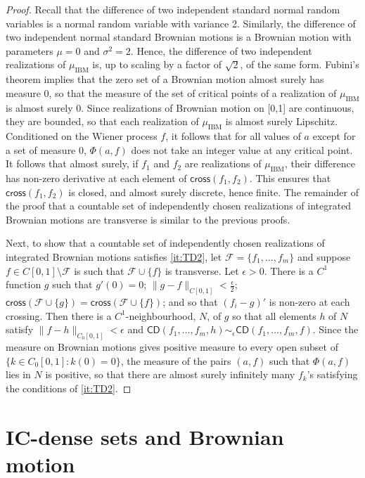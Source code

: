 \documentclass{daj}
\newcommand{\cross}{\mathsf{cross}}
\newcommand{\CD}{\mathsf{CD}}
\begin{document}
\begin{proof}
Recall that the difference of two independent standard normal random variables is a normal random
variable with variance 2. Similarly, the difference of two independent normal standard Brownian motions
is a Brownian motion with parameters $\mu=0$ and $\sigma^2=2$. Hence, the difference of two
independent realizations of $\mu_\text{IBM}$ is, up to scaling by a factor of $\sqrt 2$, of the same form.
Fubini's theorem implies that the zero set of a Brownian motion almost surely has measure 0, so that
the measure of the set of critical points of a realization of $\mu_\text{IBM}$ is almost surely 0.
Since realizations of Brownian motion on [0,1] are continuous, they are bounded, so that each realization of
$\mu_\text{IBM}$ is almost surely Lipschitz. Conditioned on the Wiener process $f$, it follows that for
all values of $a$ except for a set of measure 0, $\Phi(a,f)$ does not take an integer value at any
critical point. It follows that almost surely, if $f_1$ and $f_2$ are realizations of $\mu_\text{IBM}$,
their difference has non-zero derivative at each element of $\cross(f_1,f_2)$. This ensures
that $\cross(f_1,f_2)$ is closed, and almost surely discrete, hence finite. The remainder of the proof
that a countable set of independently chosen realizations of integrated Brownian motions are
transverse is similar to the previous proofs.

Next, to show that a countable set of independently chosen realizations of integrated Brownian
motions satisfies \ref{it:TD2}, let $\mathcal F=\{f_1,\ldots,f_m\}$ and suppose
$f\in C[0,1]\setminus\mathcal F$ is such that $\mathcal F\cup\{f\}$ is transverse.
Let $\epsilon>0$. There is a $C^1$ function $g$ such that $g'(0)=0$;
$\|g-f\|_{C[0,1]}<\frac\epsilon2$; $\cross(\mathcal F\cup\{g\})=
\cross(\mathcal F\cup\{f\})$; and so that $(f_i-g)'$ is non-zero at each crossing. Then
there is a $C^1$-neighbourhood, $N$, of $g$ so that all elements $h$ of $N$
satisfy $\|f-h\|_{C_0[0,1]}<\epsilon$ and $\CD(f_1,\ldots,f_m,h)\sim_\epsilon
\CD(f_1,\ldots,f_m,f)$. Since the measure on Brownian motions gives positive measure
to every open subset of $\{k\in C_0[0,1]\colon k(0)=0\}$,
the measure of the pairs $(a,f)$ such that $\Phi(a,f)$ lies in $N$
is positive, so that there are almost surely infinitely many $f_k$'s satisfying the conditions
of \ref{it:TD2}.
\end{proof}

\section{IC-dense sets and Brownian motion}\label{secbm}
\end{document}

